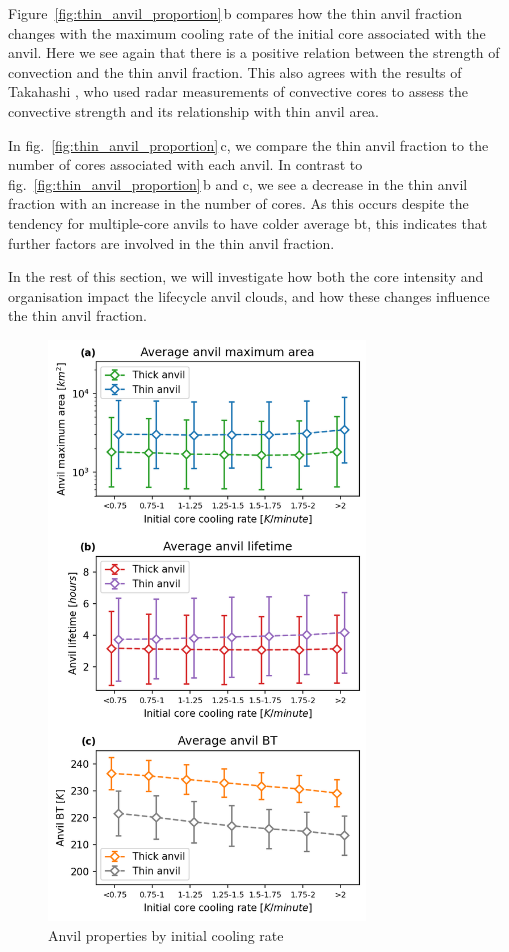 Figure~\ref{fig:thin_anvil_proportion}\,b compares how the thin anvil fraction changes with the maximum cooling rate of the initial core associated with the anvil.
Here we see again that there is a positive relation between the strength of convection and the thin anvil fraction.
This also agrees with the results of Takahashi \cite{takahashi_comms}, who used radar measurements of convective cores to assess the convective strength and its relationship with thin anvil area.

In fig.~\ref{fig:thin_anvil_proportion}\,c, we compare the thin anvil fraction to the number of cores associated with each anvil.
In contrast to fig.~\ref{fig:thin_anvil_proportion}\,b and c, we see a decrease in the thin anvil fraction with an increase in the number of cores.
As this occurs despite the tendency for multiple-core anvils to have colder average \acrshort{bt}, this indicates that further factors are involved in the thin anvil fraction.

In the rest of this section, we will investigate how both the core intensity and organisation impact the lifecycle anvil clouds, and how these changes influence the thin anvil fraction.

\begin{figure}[tp]
    \centering
    \includegraphics[width=0.75\textwidth]{figures/ch2_21.png}
    \caption{Anvil properties by initial cooling rate}
    \label{fig:anvil_cooling_rate_properties}
\end{figure}

